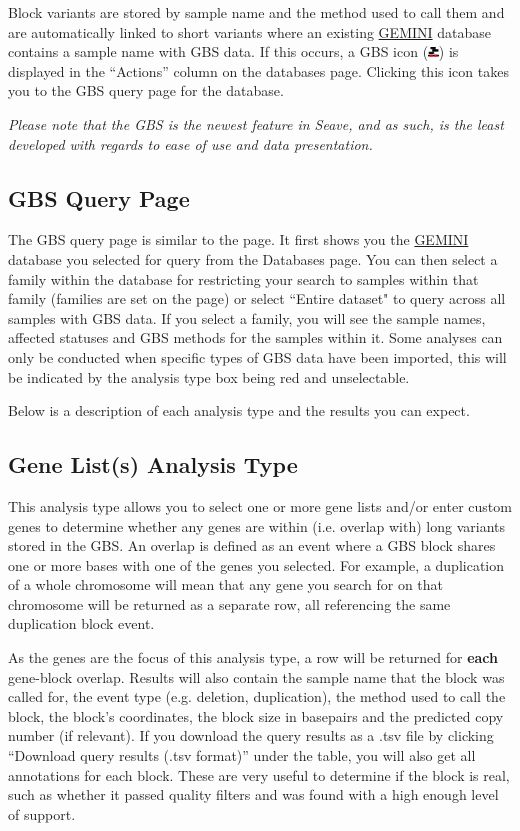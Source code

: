 \documentclass[11pt, a4paper]{article}
\newcommand{\GEMINI}{\href{https://gemini.readthedocs.io}{GEMINI} } %
\begin{document}
Block variants are stored by sample name and the method used to call them and are automatically linked to short variants where an existing \GEMINI database contains a sample name with GBS data. If this occurs, a GBS icon (\includegraphics[width=8pt]{GBS-Icon.png}) is displayed in the ``Actions'' column on the databases page. Clicking this icon takes you to the GBS query page for the database.

\textit{Please note that the GBS is the newest feature in Seave, and as such, is the least developed with regards to ease of use and data presentation.}

\subsection{GBS Query Page}

The GBS query page is similar to the  page. It first shows you the \GEMINI database you selected for query from the Databases page. You can then select a family within the database for restricting your search to samples within that family (families are set on the  page) or select ``Entire dataset" to query across all samples with GBS data. If you select a family, you will see the sample names, affected statuses and GBS methods for the samples within it. Some analyses can only be conducted when specific types of GBS data have been imported, this will be indicated by the analysis type box being red and unselectable.

Below is a description of each analysis type and the results you can expect.

\subsection{Gene List(s) Analysis Type}

This analysis type allows you to select one or more gene lists and/or enter custom genes to determine whether any genes are within (i.e. overlap with) long variants stored in the GBS. An overlap is defined as an event where a GBS block shares one or more bases with one of the genes you selected. For example, a duplication of a whole chromosome will mean that any gene you search for on that chromosome will be returned as a separate row, all referencing the same duplication block event.

As the genes are the focus of this analysis type, a row will be returned for \textbf{each} gene-block overlap. Results will also contain the sample name that the block was called for, the event type (e.g. deletion, duplication), the method used to call the block, the block's coordinates, the block size in basepairs and the predicted copy number (if relevant). If you download the query results as a .tsv file by clicking ``Download query results (.tsv format)'' under the table, you will also get all annotations for each block. These are very useful to determine if the block is real, such as whether it passed quality filters and was found with a high enough level of support. 
\end{document}
